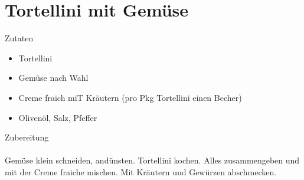 \section*{Tortellini mit Gemüse}
\ihead{}\ohead{}
\cfoot{}
{\Large Zutaten}
\begin{multicols}{2}
\begin{itemize}
    \item Tortellini
    \item Gemüse nach Wahl
    \item Creme fraich miT Kräutern (pro Pkg Tortellini einen Becher)
    \item Olivenöl, Salz, Pfeffer
\end{itemize}
\end{multicols}
\noindent
{\Large Zubereitung}\\
\\
Gemüse klein schneiden, andünsten.
Tortellini kochen.
Alles zusammengeben und mit der Creme fraiche mischen.
Mit Kräutern und Gewürzen abschmecken.